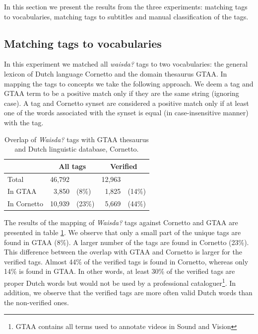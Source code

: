 In this section we present the results from the three experiments: matching
tags to vocabularies, matching tags to subtitles and manual classification of
the tags.

\subsection{Matching tags to vocabularies}
\label{tags-in-vocabularies}

In this experiment we matched all \emph{waisda?} tags to two vocabularies: the
general lexicon of Dutch language Cornetto and the domain thesaurus GTAA. In
mapping the tags to concepts we take the following approach. We deem a tag and
GTAA term to be a positive match only if they are the same string (ignoring
case). A tag and Cornetto synset are considered a positive match only if at
least one of the words associated with the synset is equal (in
case-insensitive manner) with the tag.

\begin{table}[tb]
\begin{footnotesize}
\centering
\begin{tabular*}{\columnwidth}{@{\extracolsep{\fill}}lrlrl}
\toprule
\T \B & \multicolumn{2}{c}{\textbf{All tags}} & \multicolumn{2}{c}{\textbf{Verified}} \\
\midrule
 Total \T \B & 46,792 && 12,963&\\
 In GTAA \B & 3,850 & (8\%) & 1,825 & (14\%)\\
 In Cornetto \B & 10,939 & (23\%) & 5,669 & (44\%)\\
\bottomrule
\end{tabular*}
\caption{Overlap of \emph{Waisda?} tags with GTAA thesaurus and Dutch linguistic database, Cornetto.}
\label{tab:overlap}
\end{footnotesize}
\end{table}

The results of the mapping of \emph{Waisda?} tags against Cornetto and GTAA
are presented in table \ref{tab:overlap}. We observe that only a small part of
the unique tags are found in GTAA (8\%). A larger number of the tags are found
in Cornetto (23\%). This difference between the overlap with GTAA and Cornetto
is larger for the verified tags. Almost 44\% of the verified tags is found in
Cornetto, whereas only 14\% is found in GTAA. In other words, at least 30\% of the
verified tags are proper Dutch words but would not be used by a professional
cataloguer\footnote{GTAA contains all terms used to annotate videos in Sound
and Vision}. In addition, we observe that the verified tags are more often
valid Dutch words than the non-verified ones.

